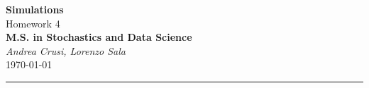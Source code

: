 \documentclass[12pt,a4paper]{article}
\begin{document}
	\textcolor{UM_Brown}{
		\begin{center}
			\textbf{\Large Simulations}\\
			\vspace{5pt}
			Homework 4 \\
			\vspace{5pt}
			\textbf{M.S. in Stochastics and Data Science}\\
			\vspace{20pt}
			\textit{Andrea Crusi, Lorenzo Sala} \\
			\vspace{5pt}
			\today
		\end{center}
		\vspace{10pt}
		\hrule
	}
	
	
	
\end{document}
